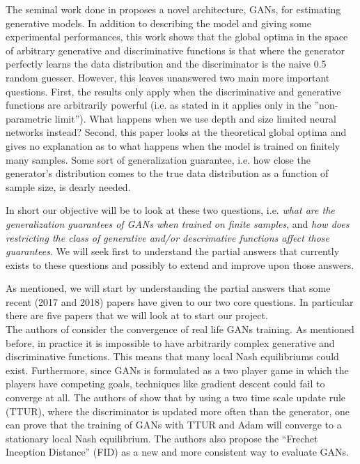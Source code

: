 \documentclass[11pt]{hw-template}
\begin{document}
\maketitle


The seminal work done in \cite{NIPS2014_5423} proposes a novel architecture, GANs, for estimating generative models. In addition to describing the model and giving some experimental performances,
this work shows that the global optima in the space of arbitrary generative and discriminative functions is that where the generator perfectly learns the data distribution and the discriminator is
the naive 0.5 random guesser. However, this leaves unanswered two main more important questions. First, the results only apply when the discriminative and generative functions are arbitrarily powerful
(i.e. as stated in \cite{NIPS2014_5423} it applies only in the ''non-parametric limit''). What happens when we use depth and size limited neural networks instead? Second, this paper looks at the
theoretical global optima and gives no explanation as to what happens when the model is trained on finitely many samples. Some sort of generalization guarantee, i.e. how close the generator's distribution
comes to the true data distribution as a function of sample size, is dearly needed. 


In short our objective will be to look at these two questions, i.e. \textit{what are the generalization guarantees of GANs when trained on finite samples}, and 
\textit{how does restricting the class of generative and/or descrimative functions
affect those guarantees}. We will seek first to understand the partial answers that currently exists to these questions and possibly to extend and improve upon those answers.


As mentioned, we will start by understanding the partial answers that some recent (2017 and 2018) papers have given to our two core questions. 
In particular there are five papers that we will look at to start our project.\\

The authors of \cite{NIPS2017_7240} consider the convergence of real life GANs training. As mentioned before, in practice it is impossible to have arbitrarily complex generative and discriminative functions. This means
that many local Nash equilibriums could exist. Furthermore, since GANs is formulated as a two player game in which the players have competing goals, techniques like gradient descent could fail to converge at all.
The authors of \cite{NIPS2017_7240} show that by using a two time scale update rule (TTUR), where the discriminator is updated more often than the generator, one can prove that the training of GANs
with TTUR and Adam will converge to
a stationary local Nash equilibrium. The authors also propose the ``Frechet Inception Distance'' (FID) as a new and more consistent way to evaluate GANs.\\
\end{document}
